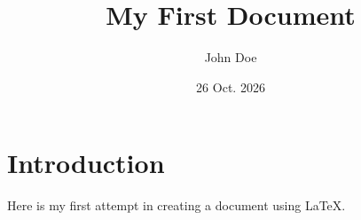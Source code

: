 \documentclass{article}
\title{My First Document}
\author{John Doe}
\date{26 Oct. 2026}
\begin{document}
	\maketitle
	
	\section{Introduction}
		Here is my first attempt in creating a document using \LaTeX.
\end{document}
